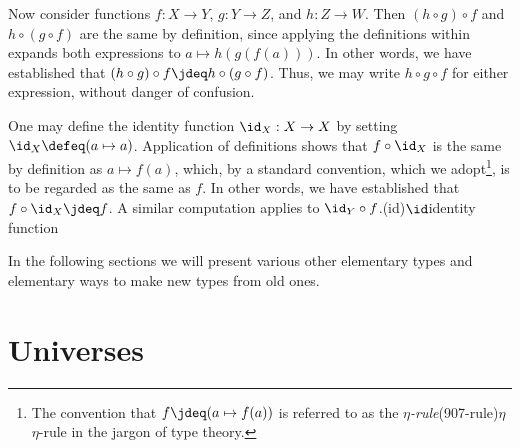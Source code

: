 Now consider functions $f : X \to Y$, $g : Y \to Z$, and $h : Z \to W$.  Then $(h \circ g) \circ f$ and $h \circ (g \circ f)$ are the same by
definition, since applying the definitions within expands both expressions to $a \mapsto h(g(f(a)))$.  In other
words, we have established that $(h \circ g) \circ f \jdeq h \circ (g \circ f)$.  Thus, we may write $h \circ g \circ f$ for
either expression, without danger of confusion.

One may define the identity function $\id_X : X \to X$ by setting $\id_X \defeq (a \mapsto a)$.  Application of definitions shows that
$f \circ \id_X$ is the same by definition as $a \mapsto f(a)$, which, by a standard convention, which we adopt\footnote{The convention that
  $f \jdeq (a \mapsto f(a))$ is referred to as the \emph{$\eta$-rule}\glossary(907-rule){$\eta$}{$\eta$-rule} in the jargon of type theory.}, is to be regarded as the same as $f$.  In
other words, we have established that $f \circ \id_X \jdeq f$.%
\label{page:idofetaf}
A similar computation applies to $\id_Y \circ f$.\glossary(id){$\id$}{identity function}

In the following sections we will present various other elementary types and elementary ways to make new types from old ones.

\section{Universes}
\label{sec:universes}

